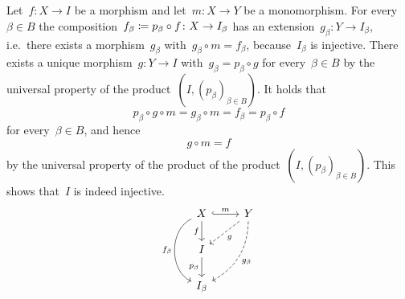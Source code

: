 \section{}

Let~$f \colon X \to I$ be a morphism and let~$m \colon X \to Y$ be a monomorphism.
For every~$\beta \in B$ the composition~$f_\beta \coloneqq p_\beta \circ f \colon X \to I_\beta$ has an extension~$g_\beta \colon Y \to I_\beta$, i.e.\ there exists a morphism~$g_\beta$ with~$g_\beta \circ m = f_\beta$, because~$I_\beta$ is injective.
There exists a unique morphism~$g \colon Y \to I$ with~$g_\beta = p_\beta \circ g$ for every~$\beta \in B$ by the universal property of the product~$(I, (p_\beta)_{\beta \in B})$.
It holds that
\[
  p_\beta \circ g \circ m
  =
  g_\beta \circ m
  =
  f_\beta
  =
  p_\beta \circ f
\]
for every~$\beta \in B$, and hence
\[
  g \circ m
  =
  f
\]
by the universal property of the product of the product~$(I, (p_\beta)_{\beta \in B})$.
This shows that~$I$ is indeed injective.
\[
  \begin{tikzcd}
      X
      \arrow[hook]{r}[above]{m}
      \arrow{d}[left]{f}
      \arrow[bend right = 65]{dd}[left]{f_\beta}
    & Y
      \arrow[dashed]{dl}[below right]{g}
      \arrow[dashed, bend left]{ddl}[below right]{g_\beta}
    \\
      I
      \arrow{d}[left]{p_\beta}
    & {}
    \\
      I_\beta
    & {}
  \end{tikzcd}
\]





